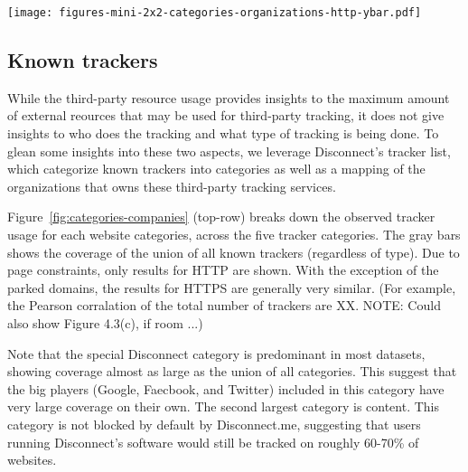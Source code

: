 \documentclass{sig-alternate-10pt}
\begin{document}
\begin{figure*}[t]
\texttt{[image: figures-mini-2x2-categories-organizations-http-ybar.pdf]}
\caption{Domain covererage of different categories of known tracker services (top row)
and companies (bottom row), as per Disconnect's blocking list.}
\label{fig:categories-companies}
\vspace{-0pt}
\end{figure*}


\subsection{Known trackers}

While the third-party resource usage provides insights to the maximum
amount of external reources that may be used for third-party tracking,
it does not give insights to who does the tracking and what type of 
tracking is being done.
To glean some insights into these two aspects,
we leverage Disconnect's tracker list,
which categorize known trackers into categories as well as 
a mapping of the organizations that owns these third-party tracking services.

Figure~\ref{fig:categories-companies} (top-row) breaks down the observed 
tracker usage for each website categories,
across the five tracker categories.
The gray bars shows the coverage of the union of all known trackers (regardless of type).  
Due to page constraints, 
only results for HTTP are shown.
With the exception of the parked domains,
the results for HTTPS are generally very similar.
(For example, the Pearson corralation of the total number of
trackers are XX.  NOTE: Could also show Figure 4.3(c), if room ...)

Note that the  special Disconnect category is predominant in most datasets, 
showing coverage almost as large as the union of all categories. 
This suggest that the big players (Google, Faecbook, and Twitter) included
in this category have very large coverage on their own.
The second largest category is content.
This category is not blocked by default by Disconnect.me,
suggesting that users running Disconnect's software would still be tracked
on roughly 60-70\% of websites.
\end{document}
